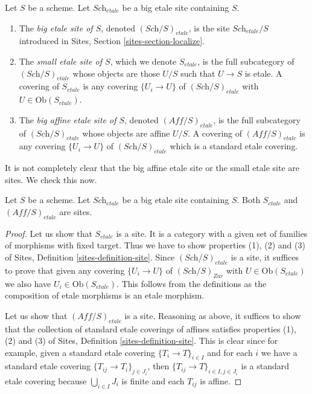 \begin{definition}
\label{definition-big-small-etale}
Let $S$ be a scheme. Let $\textit{Sch}_{etale}$ be a big etale
site containing $S$.
\begin{enumerate}
\item The {\it big etale site of $S$}, denoted
$(\textit{Sch}/S)_{etale}$, is the site $\textit{Sch}_{etale}/S$
introduced in Sites, Section \ref{sites-section-localize}.
\item The {\it small etale site of $S$}, which we denote
$S_{etale}$, is the full subcategory of $(\textit{Sch}/S)_{etale}$
whose objects are those $U/S$ such that $U \to S$ is etale.
A covering of $S_{etale}$ is any covering $\{U_i \to U\}$ of
$(\textit{Sch}/S)_{etale}$ with $U \in \text{Ob}(S_{etale})$.
\item The {\it big affine etale site of $S$}, denoted
$(\textit{Aff}/S)_{etale}$, is the full subcategory of
$(\textit{Sch}/S)_{etale}$ whose objects are affine $U/S$.
A covering of $(\textit{Aff}/S)_{etale}$ is any covering
$\{U_i \to U\}$ of $(\textit{Sch}/S)_{etale}$ which is a
standard etale covering.
\end{enumerate}
\end{definition}

\noindent
It is not completely clear that
the big affine etale site or the small etale site are sites.
We check this now.

\begin{lemma}
\label{lemma-verify-site-etale}
Let $S$ be a scheme. Let $\textit{Sch}_{etale}$ be a big etale
site containing $S$.
Both $S_{etale}$ and $(\textit{Aff}/S)_{etale}$ are sites.
\end{lemma}

\begin{proof}
Let us show that $S_{etale}$ is a site. It is a category with a
given set of families of morphisms with fixed target. Thus we
have to show properties (1), (2) and (3) of
Sites, Definition \ref{sites-definition-site}.
Since $(\textit{Sch}/S)_{etale}$ is a site, it suffices to prove
that given any covering $\{U_i \to U\}$ of $(\textit{Sch}/S)_{Zar}$
with $U \in \text{Ob}(S_{etale})$ we also have $U_i \in \text{Ob}(S_{etale})$.
This follows from the definitions as the composition of etale morphisms
is an etale morphism.

\medskip\noindent
Let us show that $(\textit{Aff}/S)_{etale}$ is a site.
Reasoning as above, it suffices to show that the collection
of standard etale coverings of affines satisfies properties
(1), (2) and (3) of
Sites, Definition \ref{sites-definition-site}.
This is clear since for example, given a standard etale
covering $\{T_i \to T\}_{i\in I}$ and for each
$i$ we have a standard etale covering $\{T_{ij} \to T_i\}_{j\in J_i}$, then
$\{T_{ij} \to T\}_{i \in I, j\in J_i}$ is a standard etale covering
because $\bigcup_{i\in I} J_i$ is finite and each $T_{ij}$ is affine.
\end{proof}

